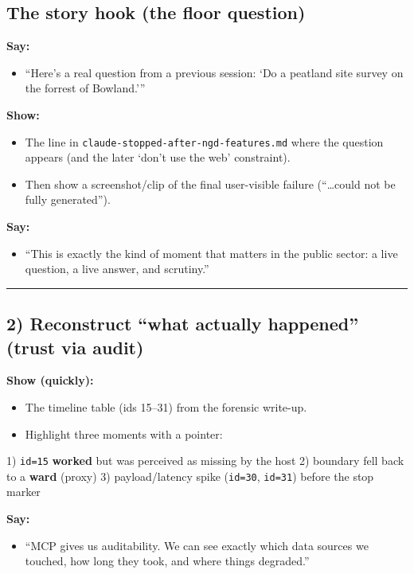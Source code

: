 \subsection{The story hook (the floor question)}
\textbf{Say:}
\begin{itemize}[leftmargin=*]
\item “Here’s a real question from a previous session: ‘Do a peatland site survey on the forrest of Bowland.’”
\end{itemize}

\textbf{Show:}
\begin{itemize}[leftmargin=*]
\item The line in \texttt{claude-stopped-after-ngd-features.md} where the question appears (and the later ‘don’t use the web’ constraint).
\item Then show a screenshot/clip of the final user-visible failure (“…could not be fully generated”).
\end{itemize}

\textbf{Say:}
\begin{itemize}[leftmargin=*]
\item “This is exactly the kind of moment that matters in the public sector: a live question, a live answer, and scrutiny.”
\end{itemize}

\par\medskip\hrule\medskip

\subsection{2) Reconstruct “what actually happened” (trust via audit)}
\textbf{Show (quickly):}
\begin{itemize}[leftmargin=*]
\item The timeline table (ids 15–31) from the forensic write-up.
\item Highlight three moments with a pointer:
\end{itemize}
  1) \texttt{id=15} \textbf{worked} but was perceived as missing by the host
  2) boundary fell back to a \textbf{ward} (proxy)
  3) payload/latency spike (\texttt{id=30}, \texttt{id=31}) before the stop marker

\textbf{Say:}
\begin{itemize}[leftmargin=*]
\item “MCP gives us auditability. We can see exactly which data sources we touched, how long they took, and where things degraded.” \cite{mcp_spec_2025_11_25,prov_o,algorithmic_transparency_recording_standard}
\end{itemize}

